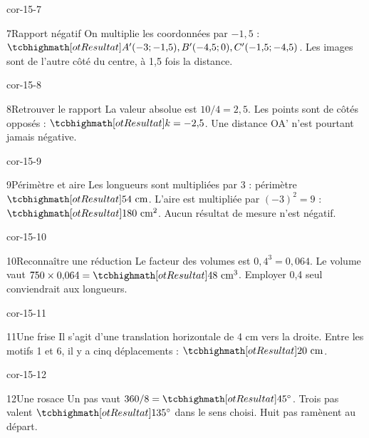 \begin{blocLivre}{cor-15-7}\begin{corrige}{7}{Rapport négatif}
On multiplie les coordonnées par $-1{,}5$ : $\res{A'(-3;-1{,}5),B'(-4{,}5;0),C'(-1{,}5;-4{,}5)}$. Les images sont de l’autre côté du centre, à 1,5 fois la distance.
\label{fig-cor-15-7}
\end{corrige}\end{blocLivre}
\begin{blocLivre}{cor-15-8}\begin{corrige}{8}{Retrouver le rapport}
La valeur absolue est $10/4=2{,}5$. Les points sont de côtés opposés : $\res{k=-2{,}5}$. Une distance OA’ n’est pourtant jamais négative.
\label{fig-cor-15-8}
\end{corrige}\end{blocLivre}
\begin{blocLivre}{cor-15-9}\begin{corrige}{9}{Périmètre et aire}
Les longueurs sont multipliées par 3 : périmètre $\res{54\text{ cm}}$. L’aire est multipliée par $(-3)^2=9$ : $\res{180\text{ cm}^2}$. Aucun résultat de mesure n’est négatif.
\label{fig-cor-15-9}
\end{corrige}\end{blocLivre}
\begin{blocLivre}{cor-15-10}\begin{corrige}{10}{Reconnaître une réduction}
Le facteur des volumes est $0{,}4^3=0{,}064$. Le volume vaut $750\times0{,}064=\res{48\text{ cm}^3}$. Employer 0,4 seul conviendrait aux longueurs.
\label{fig-cor-15-10}
\end{corrige}\end{blocLivre}
\begin{blocLivre}{cor-15-11}\begin{corrige}{11}{Une frise}
Il s’agit d’une translation horizontale de 4 cm vers la droite. Entre les motifs 1 et 6, il y a cinq déplacements : $\res{20\text{ cm}}$.
\label{fig-cor-15-11}
\end{corrige}\end{blocLivre}
\begin{blocLivre}{cor-15-12}\begin{corrige}{12}{Une rosace}
Un pas vaut $360/8=\res{45^\circ}$. Trois pas valent $\res{135^\circ}$ dans le sens choisi. Huit pas ramènent au départ.
\label{fig-cor-15-12}
\end{corrige}\end{blocLivre}
